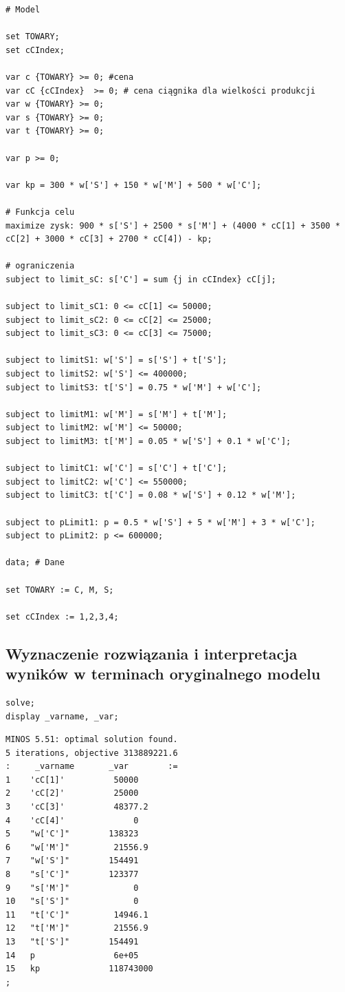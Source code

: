 \documentclass{article}
\begin{document}
\lstset{language=AMPL}
\begin{lstlisting}[caption={Model napisany w języku AMPL},label=DescriptiveLabel]
# Model

set TOWARY;
set cCIndex;

var c {TOWARY} >= 0; #cena
var cC {cCIndex}  >= 0; # cena ciągnika dla wielkości produkcji
var w {TOWARY} >= 0;
var s {TOWARY} >= 0;
var t {TOWARY} >= 0;

var p >= 0;

var kp = 300 * w['S'] + 150 * w['M'] + 500 * w['C'];

# Funkcja celu
maximize zysk: 900 * s['S'] + 2500 * s['M'] + (4000 * cC[1] + 3500 * cC[2] + 3000 * cC[3] + 2700 * cC[4]) - kp;

# ograniczenia
subject to limit_sC: s['C'] = sum {j in cCIndex} cC[j];

subject to limit_sC1: 0 <= cC[1] <= 50000;
subject to limit_sC2: 0 <= cC[2] <= 25000;
subject to limit_sC3: 0 <= cC[3] <= 75000;

subject to limitS1: w['S'] = s['S'] + t['S'];
subject to limitS2: w['S'] <= 400000;
subject to limitS3: t['S'] = 0.75 * w['M'] + w['C'];

subject to limitM1: w['M'] = s['M'] + t['M'];
subject to limitM2: w['M'] <= 50000;
subject to limitM3: t['M'] = 0.05 * w['S'] + 0.1 * w['C'];

subject to limitC1: w['C'] = s['C'] + t['C'];
subject to limitC2: w['C'] <= 550000;
subject to limitC3: t['C'] = 0.08 * w['S'] + 0.12 * w['M'];

subject to pLimit1: p = 0.5 * w['S'] + 5 * w['M'] + 3 * w['C'];
subject to pLimit2: p <= 600000;

data; # Dane

set TOWARY := C, M, S;

set cCIndex := 1,2,3,4;
\end{lstlisting}

\subsection{Wyznaczenie rozwiązania i interpretacja wyników w terminach oryginalnego modelu}

\lstset{language=BASH}
\begin{lstlisting}[caption={Komendy uruchamiające solver MINOS na stronie https://ampl.com/cgi-bin/ampl/amplcgi},label=DescriptiveLabel]
solve;
display _varname, _var;
\end{lstlisting}

\lstset{language=BASH}
\begin{lstlisting}[caption={Wynik solwera},label=DescriptiveLabel]
MINOS 5.51: optimal solution found.
5 iterations, objective 313889221.6
:     _varname       _var        :=
1    'cC[1]'          50000
2    'cC[2]'          25000
3    'cC[3]'          48377.2
4    'cC[4]'              0
5    "w['C']"        138323
6    "w['M']"         21556.9
7    "w['S']"        154491
8    "s['C']"        123377
9    "s['M']"             0
10   "s['S']"             0
11   "t['C']"         14946.1
12   "t['M']"         21556.9
13   "t['S']"        154491
14   p                6e+05
15   kp              118743000
;
\end{lstlisting}
\end{document}
